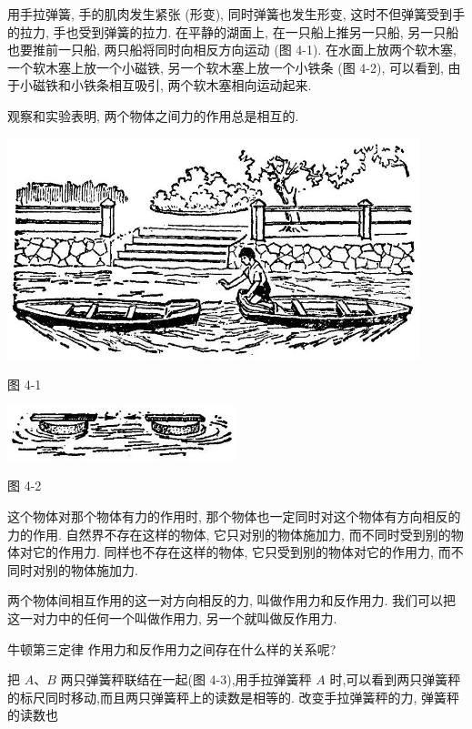 \documentclass[10pt]{article}
\begin{document}
用手拉弹簧, 手的肌肉发生紧张 (形变), 同时弹簧也发生形变, 这时不但弹簧受到手的拉力, 手也受到弹簧的拉力. 在平静的湖面上, 在一只船上推另一只船, 另一只船也要推前一只船, 两只船将同时向相反方向运动 (图 4-1). 在水面上放两个软木塞, 一个软木塞上放一个小磁铁, 另一个软木塞上放一个小铁条 (图 4-2), 可以看到, 由于小磁铁和小铁条相互吸引, 两个软木塞相向运动起来.

观察和实验表明, 两个物体之间力的作用总是相互的.

\begin{center}
\includegraphics[max width=0.9\textwidth]{images/01912d55-147c-70aa-b0e0-1782a122f948_112_380718.jpg}
\end{center}

图 4-1

\begin{center}
\includegraphics[max width=0.5\textwidth]{images/01912d55-147c-70aa-b0e0-1782a122f948_112_435536.jpg}
\end{center}

图 4-2

这个物体对那个物体有力的作用时, 那个物体也一定同时对这个物体有方向相反的力的作用. 自然界不存在这样的物体, 它只对别的物体施加力, 而不同时受到别的物体对它的作用力. 同样也不存在这样的物体, 它只受到别的物体对它的作用力, 而不同时对别的物体施加力.

两个物体间相互作用的这一对方向相反的力, 叫做作用力和反作用力. 我们可以把这一对力中的任何一个叫做作用力, 另一个就叫做反作用力.

牛顿第三定律 作用力和反作用力之间存在什么样的关系呢?

把 \(A\text{、}B\) 两只弹簧秤联结在一起(图 4-3),用手拉弹簧秤 \(A\) 时,可以看到两只弹簧秤的标尺同时移动,而且两只弹簧秤上的读数是相等的. 改变手拉弹簧秤的力, 弹簧秤的读数也
\end{document}
